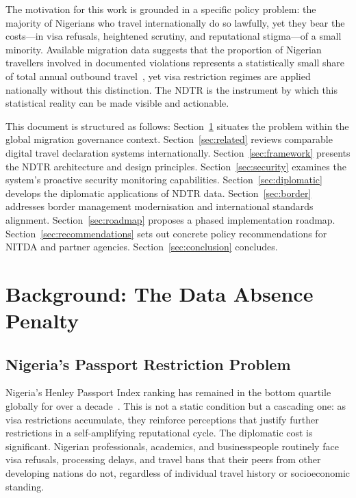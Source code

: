 \documentclass[11pt]{article}
\begin{document}
The motivation for this work is grounded in a specific policy problem:
the majority of Nigerians who travel internationally do so lawfully,
yet they bear the costs---in visa refusals, heightened scrutiny, and
reputational stigma---of a small minority. Available migration data suggests
that the proportion of Nigerian travellers involved in documented violations
represents a statistically small share of total annual outbound
travel~\cite{iom2023,unodc2022}, yet visa restriction regimes are applied
nationally without this distinction. The NDTR is the instrument by which
this statistical reality can be made visible and actionable.

This document is structured as follows:
Section~\ref{sec:background} situates the problem within the global
migration governance context.
Section~\ref{sec:related} reviews comparable digital travel declaration
systems internationally.
Section~\ref{sec:framework} presents the NDTR architecture and design
principles.
Section~\ref{sec:security} examines the system's proactive security
monitoring capabilities.
Section~\ref{sec:diplomatic} develops the diplomatic applications of NDTR data.
Section~\ref{sec:border} addresses border management modernisation and
international standards alignment.
Section~\ref{sec:roadmap} proposes a phased implementation roadmap.
Section~\ref{sec:recommendations} sets out concrete policy recommendations
for NITDA and partner agencies.
Section~\ref{sec:conclusion} concludes.

\section{Background: The Data Absence Penalty}
\label{sec:background}

\subsection{Nigeria's Passport Restriction Problem}

Nigeria's Henley Passport Index ranking has remained in the bottom
quartile globally for over a decade~\cite{henley2025}. This is not a
static condition but a cascading one: as visa restrictions accumulate,
they reinforce perceptions that justify further restrictions in a
self-amplifying reputational cycle. The diplomatic cost is significant.
Nigerian professionals, academics, and businesspeople routinely face
visa refusals, processing delays, and travel bans that their peers
from other developing nations do not, regardless of individual
travel history or socioeconomic standing.
\end{document}
